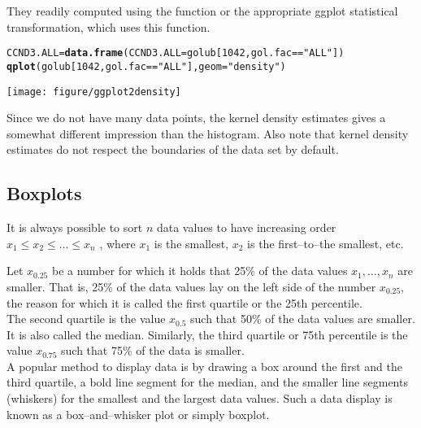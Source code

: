 \documentclass{article}\usepackage[]{graphicx}\usepackage[usenames,dvipsnames]{color}
\makeatletter
\def\maxwidth{ %
  \ifdim\Gin@nat@width>\linewidth
    \linewidth
  \else
    \Gin@nat@width
  \fi
}
\newcommand{\hlnum}[1]{\textcolor[rgb]{0.686,0.059,0.569}{#1}}%
\newcommand{\hlstr}[1]{\textcolor[rgb]{0.192,0.494,0.8}{#1}}%
\newcommand{\hlopt}[1]{\textcolor[rgb]{0,0,0}{#1}}%
\newcommand{\hlstd}[1]{\textcolor[rgb]{0.345,0.345,0.345}{#1}}%
\newcommand{\hlkwb}[1]{\textcolor[rgb]{0.69,0.353,0.396}{#1}}%
\newcommand{\hlkwc}[1]{\textcolor[rgb]{0.333,0.667,0.333}{#1}}%
\newcommand{\hlkwd}[1]{\textcolor[rgb]{0.737,0.353,0.396}{\textbf{#1}}}%
\newenvironment{kframe}{%
 \def\at@end@of@kframe{}%
 \ifinner\ifhmode%
  \def\at@end@of@kframe{\end{minipage}}%
  \begin{minipage}{\columnwidth}%
 \fi\fi%
 \def\FrameCommand##1{\hskip\@totalleftmargin \hskip-\fboxsep
 \colorbox{shadecolor}{##1}\hskip-\fboxsep
     \hskip-\linewidth \hskip-\@totalleftmargin \hskip\columnwidth}%
 \MakeFramed {\advance\hsize-\width
   \@totalleftmargin\z@ \linewidth\hsize
   \@setminipage}}%
 {\par\unskip\endMakeFramed%
 \at@end@of@kframe}
\newenvironment{knitrout}{}{} %
\makeatother
\begin{document}
They readily computed using the \R  \hspace{2pt} function  or the appropriate
ggplot statistical transformation, which uses this function.

\begin{knitrout}
\color{fgcolor}\begin{kframe}
\begin{alltt}
\hlstd{CCND3.ALL} \hlkwb{=} \hlkwd{data.frame}\hlstd{(}\hlkwc{CCND3.ALL} \hlstd{= golub[}\hlnum{1042}\hlstd{, gol.fac}\hlopt{==}\hlstr{"ALL"}\hlstd{])}
 \hlkwd{qplot}\hlstd{(golub[}\hlnum{1042}\hlstd{, gol.fac}\hlopt{==}\hlstr{"ALL"}\hlstd{],} \hlkwc{geom} \hlstd{=} \hlstr{"density"}\hlstd{)}
\end{alltt}
\end{kframe}
\texttt{[image: figure/ggplot2density]} 

\end{knitrout}

Since we do not have many data points, the kernel density estimates 
gives a somewhat different impression than the histogram. Also note 
that kernel density estimates do not respect the boundaries of the
data set by default.

\subsection{Boxplots}
It is always possible to sort $n$ data values to have increasing order $x_1 \leq 
x_2 \leq \dots \leq x_n$ , where $x_1$ is the smallest, $x_2$ is the first--to--the 
smallest, etc. 

Let $x_{0.25}$ be a number for which it holds that 25\% of the data values 
$x_1 , \dotsc, x_n$ are smaller. That is, 25\% of the data values 
lay on the left side of the number $x_{0.25}$, the reason for which it is called the first quartile or the 25th percentile. \\


The second quartile is the value $x_{0.5}$ such that 50\% of the data values are
smaller. It is also called the median. 
Similarly, the third quartile or 75th percentile is the value $x_{0.75}$ such
that 75\% of the data is smaller.\\

A popular method to display data is by drawing a box around the first and the 
third quartile, a bold line segment for the median, and the
smaller line segments (whiskers) for the smallest and
the largest data values. Such a data display is known as a box--and--whisker
plot or simply boxplot.
\end{document}
